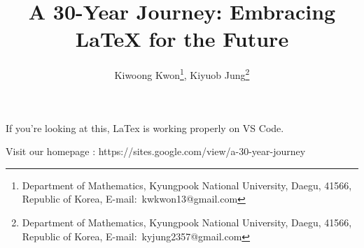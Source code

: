 \documentclass[a4paper,11pt]{article}
\title{
    A 30-Year Journey: Embracing LaTeX for the Future}
\author{
    Kiwoong Kwon\thanks{Department of Mathematics, Kyungpook National University, Daegu, 41566, Republic of Korea, E-mail:~kwkwon13@gmail.com},
    Kiyuob Jung\thanks{Department of Mathematics, Kyungpook National University, Daegu, 41566, Republic of Korea, E-mail:~kyjung2357@gmail.com}
    }
\begin{document}
\date{}
\maketitle

If you're looking at this, LaTex is working properly on VS Code.

Visit our homepage : https://sites.google.com/view/a-30-year-journey
\end{document}
